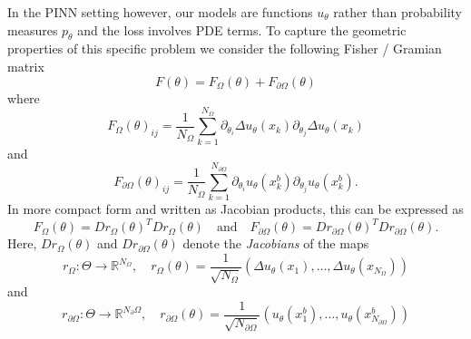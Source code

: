 \documentclass[11pt]{article}
\theoremstyle{definition}
\theoremstyle{plain}
\begin{document}
In the PINN setting however, our models are functions $u_\theta$ rather than probability measures $p_\theta$ and the loss involves PDE terms.
To capture the geometric properties of this specific problem we consider the following Fisher / Gramian matrix %
\begin{equation*}
  F(\theta) = F_\Omega(\theta) + F_{\partial\Omega}(\theta)
\end{equation*}
where
\begin{equation}\label{eq:FisherInterior}
  F_\Omega(\theta)_{ij} = \frac1{{N_\Omega}} \sum_{k=1}^{N_\Omega} \partial_{\theta_i} \Delta u_\theta(x_k) \partial_{\theta_j} \Delta u_\theta(x_k)
\end{equation}
and
\begin{equation}
  F_{\partial\Omega}(\theta)_{ij} = \frac1{{N_\Omega}} \sum_{k=1}^{N_{\partial\Omega}} \partial_{\theta_i} u_\theta(x_k^b) \partial_{\theta_j} u_\theta (x_k^b).
\end{equation}
In more compact form and written as Jacobian products, this can be expressed as
\begin{equation}\label{eq:Jacobian_Fischer}
  F_\Omega(\theta) = Dr_\Omega(\theta)^T Dr_\Omega(\theta)
  \quad \text{and} \quad
  F_{\partial\Omega}(\theta) = Dr_{\partial\Omega}(\theta)^T Dr_{\partial\Omega}(\theta).
\end{equation}
Here, $Dr_\Omega(\theta)$ and $Dr_{\partial\Omega}(\theta)$  denote the \emph{Jacobians} of the maps
\begin{equation*}
  r_{\Omega}\colon \Theta \to \mathbb{R}^{N_\Omega}, \quad r_{\Omega}(\theta) = \frac{1}{\sqrt{N_{\Omega}}}(\Delta u_\theta(x_1), \dots, \Delta u_\theta(x_{N_{\Omega}}))
\end{equation*}
and
\begin{equation*}
  r_{\partial\Omega}\colon \Theta \to \mathbb{R}^{{N_\partial\Omega}}, \quad r_{\partial\Omega}(\theta) = \frac{1}{\sqrt{N_{\partial\Omega}}}(u_\theta(x^b_1), \dots, u_\theta(x^b_{N_{\partial\Omega}}))
\end{equation*}
\end{document}
